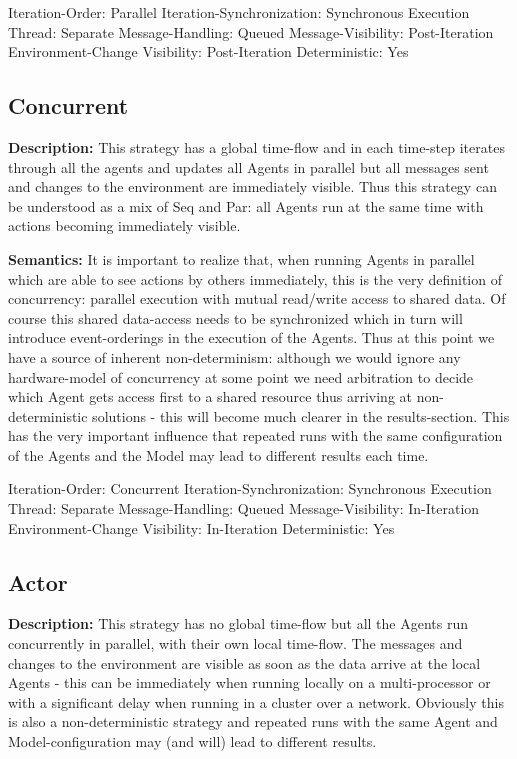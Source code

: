 	Iteration-Order:			Parallel
	Iteration-Synchronization: 	Synchronous
	Execution Thread:			Separate
 	Message-Handling:			Queued
 	Message-Visibility:			Post-Iteration
 	Environment-Change Visibility:		Post-Iteration
 	Deterministic:				Yes
 	
\subsection{Concurrent}
\textbf{Description:} This strategy has a global time-flow and in each time-step iterates through all the agents and updates all Agents in parallel but all messages sent and changes to the environment are immediately visible. Thus this strategy can be understood as a mix of Seq and Par: all Agents run at the same time with actions becoming immediately visible.

\textbf{Semantics:} It is important to realize that, when running Agents in parallel which are able to see actions by others immediately, this is the very definition of concurrency: parallel execution with mutual read/write access to shared data. Of course this shared data-access needs to be synchronized which in turn will introduce event-orderings in the execution of the Agents. Thus at this point we have a source of inherent non-determinism: although we would ignore any hardware-model of concurrency at some point we need arbitration to decide which Agent gets access first to a shared resource thus arriving at non-deterministic solutions - this will become much clearer in the results-section. This has the very important influence that repeated runs with the same configuration of the Agents and the Model may lead to different results each time.

	Iteration-Order:			Concurrent
	Iteration-Synchronization: 	Synchronous
	Execution Thread:			Separate
 	Message-Handling:			Queued
 	Message-Visibility:			In-Iteration
 	Environment-Change Visibility:		In-Iteration
 	Deterministic:				Yes

\subsection{Actor}
\textbf{Description:} This strategy has no global time-flow but all the Agents run concurrently in parallel, with their own local time-flow. The messages and changes to the environment are visible as soon as the data arrive at the local Agents - this can be immediately when running locally on a multi-processor or with a significant delay when running in a cluster over a network. Obviously this is also a non-deterministic strategy and repeated runs with the same Agent and Model-configuration may (and will) lead to different results.

